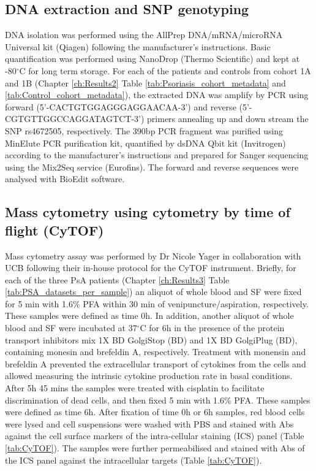 \subsection{DNA extraction and SNP genotyping}
DNA isolation was performed using the AllPrep DNA/mRNA/microRNA Universal kit (Qiagen) following the manufacturer's instructions. Basic quantification was performed using NanoDrop (Thermo Scientific) and kept at -80{$^\circ$}C for long term storage. For each of the patients and controls from cohort 1A and 1B (Chapter \ref{ch:Results2} Table \ref{tab:Psoriasis_cohort_metadata} and \ref{tab:Control_cohort_metadata}), the extracted DNA was amplify by PCR using forward (5'-CACTGTGGAGGGAGGAACAA-3') and reverse (5'-CGTGTTGGCCAGGATAGTCT-3') primers annealing up and down stream the SNP rs4672505, respectively. The 390bp PCR fragment was purified using MinElute PCR purification kit, quantified by dsDNA Qbit kit (Invitrogen) according to the manufacturer's instructions and prepared for Sanger sequencing using the Mix2Seq service (Eurofins). The forward and reverse sequences were analysed with BioEdit software.



\subsection{Mass cytometry using cytometry by time of flight (CyTOF)}
Mass cytometry assay was performed by Dr Nicole Yager in collaboration with UCB following their in-house protocol for the CyTOF instrument. Briefly, for each of the three PsA patients (Chapter \ref{ch:Results3} Table \ref{tab:PSA_datasets_per_sample}) an aliquot of whole blood and SF were fixed for 5 min with 1.6\% PFA within 30 min of venipuncture/aspiration, respectively. These samples were defined as time 0h. In addition, another aliquot of whole blood and SF were incubated at 37{$^\circ$}C for 6h in the presence of the protein transport inhibitors mix 1X BD GolgiStop (BD) and 1X BD GolgiPlug (BD), containing monesin and brefeldin A, respectively. Treatment with monensin and brefeldin A prevented the extracellular transport of cytokines from the cells and allowed measuring the intrinsic cytokine production rate in basal conditions. After 5h 45 mins the samples were treated with cisplatin to facilitate discrimination of dead cells, and then fixed 5 min with 1.6\% PFA. These samples were defined as time 6h. After fixation of time 0h or 6h samples, red blood cells were lysed and cell suspensions were washed with PBS and stained with Abs against the cell surface markers of the intra-cellular staining (ICS) panel (Table \ref{tab:CyTOF}). The samples were further permeabilised and stained with Abs of the ICS panel against the intracellular targets (Table \ref{tab:CyTOF}). 


